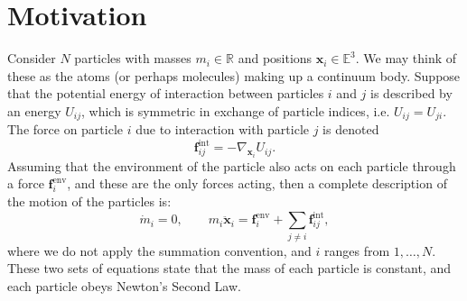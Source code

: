 \documentclass[
  letterpaper,
  DIV=11,
  numbers=noendperiod]{scrreprt}
\theoremstyle{plain}
\theoremstyle{remark}
\begin{document}
\section{Motivation}\label{motivation-1}

Consider \(N\) particles with masses \(m_i\in{\mathbb{R}}\) and
positions \({\boldsymbol{x}}_i\in{\mathbb{E}}^3\). We may think of these
as the atoms (or perhaps molecules) making up a continuum body. Suppose
that the potential energy of interaction between particles \(i\) and
\(j\) is described by an energy \(U_{ij}\), which is symmetric in
exchange of particle indices, i.e. \(U_{ij} = U_{ji}\). The force on
particle \(i\) due to interaction with particle \(j\) is denoted
\[{\boldsymbol{f}}^{\text{int}}_{ij} = -\nabla_{{\boldsymbol{x}}_i}U_{ij}.\]
Assuming that the environment of the particle also acts on each particle
through a force \({\boldsymbol{f}}^{\text{env}}_i\), and these are the
only forces acting, then a complete description of the motion of the
particles is:
\[\dot{m}_i=0,\qquad m_i\ddot{{\boldsymbol{x}}}_i = {\boldsymbol{f}}^{\text{env}}_i+\sum_{j\neq i}{\boldsymbol{f}}^{\text{int}}_{ij},\]
where we do not apply the summation convention, and \(i\) ranges from
\(1,\ldots,N\). These two sets of equations state that the mass of each
particle is constant, and each particle obeys Newton's Second Law.
\end{document}

